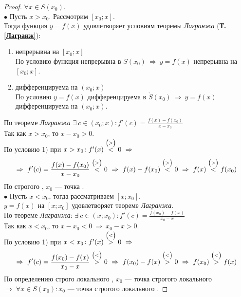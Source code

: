 \begin{proof}
	$\forall x \in S(x_0)$.\\
	$\bullet$ Пусть $x > x_0$. Рассмотрим $[x_0; x]$. \\
	Тогда функция $y=f(x)$ удовлетворяет условиям теоремы \textit{Лагранжа} (\textbf{Т.\ref{Лагранж}}):
	\begin{enumerate}
		\item непрерывна на $[x_0; x]$\\
		      По условию функция непрерывна в $S(x_0)\ \Rightarrow\ y=f(x)$ непрерывна на $[x_0; x]$.
		\item дифференцируема на $(x_0; x)$\\
		      По условию $y=f(x)$ дифференцируема в $\mathring{S}(x_0)\ \Rightarrow\ y=f(x)$ дифференцируема на $(x_0; x)$.
	\end{enumerate}
	По теореме \textit{Лагранжа} $\displaystyle \exists\ c \in (x_0; x)\colon f'(c) = \frac{f(x) - f(x_0)}{x - x_0}$\\
	Так как $x > x_0$, то $x - x_0 > 0$.\\
	По условию 1) при $x > x_0\colon f'(x) \overset{\scriptsize{\big(>\big)}}{<} 0\ \Rightarrow$
	\begin{gather*}
		\Rightarrow\ f'(c) = \frac{f(x) - f(x_0)}{x - x_0} \overset{\scriptsize{\big(>\big)}}{<} 0\ \Rightarrow\ f(x) - f(x_0) \overset{\scriptsize{\big(>\big)}}{<} 0\ \Rightarrow\ f(x) \overset{\scriptsize{\big(>\big)}}{<} f(x_0)
	\end{gather*}
	По  строгого , $x_0$ --- точка .\\
	$\bullet$ Пусть $x<x_0$, тогда рассматриваем $[x; x_0]$.\\
	$y=f(x)$ на $[x; x_0]$ удовлетворяет теореме \textit{Лагранжа}.\\[1ex]
	По теореме \textit{Лагранжа}: $\displaystyle \exists\ c \in (x; x_0)\colon f'(c) = \frac{f(x_0) - f(x)}{x_0 - x}$\\[1ex]
	Так как $x < x_0$, то $x - x_0 < 0\ \Rightarrow\ x_0-x > 0$.\\
	По условию 1) при $x < x_0\colon f'(x) \overset{\scriptsize{\big(<\big)}}{>} 0\ \Rightarrow$
	\begin{gather*}
		\Rightarrow\ f'(c) = \frac{f(x_0) - f(x)}{x_0 - x} \overset{\scriptsize{\big(<\big)}}{>} 0\ \Rightarrow\ f(x_0) - f(x) \overset{\scriptsize{\big(<\big)}}{>} 0\ \Rightarrow\ f(x_0) \overset{\scriptsize{\big(<\big)}}{>} f(x)
	\end{gather*}
	По определению строго локального , $x_0$ --- точка строгого локального\\[1ex]
	 $\Rightarrow\ \forall x \in S(x_0)\colon x_0$ --- точка строгого локального .
\end{proof} \vspace{-11pt}
